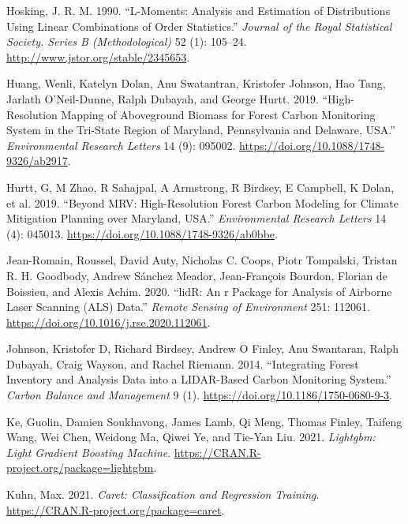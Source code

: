 \documentclass[review]{elsarticle} %
\newlength{\cslhangindent}
\newenvironment{CSLReferences}[2] %
 {%
  \setlength{\parindent}{0pt}
  \ifodd #1 \everypar{\setlength{\hangindent}{\cslhangindent}}\ignorespaces\fi
  \ifnum #2 > 0
  \setlength{\parskip}{#2\baselineskip}
  \fi
 }%
 {}
\begin{document}
\begin{CSLReferences}{1}{0}
\leavevmode{}%
Hosking, J. R. M. 1990. {``L-Moments: Analysis and Estimation of Distributions Using Linear Combinations of Order Statistics.''} \emph{Journal of the Royal Statistical Society. Series B (Methodological)} 52 (1): 105--24. \url{http://www.jstor.org/stable/2345653}.

\leavevmode{}%
Huang, Wenli, Katelyn Dolan, Anu Swatantran, Kristofer Johnson, Hao Tang, Jarlath O'Neil-Dunne, Ralph Dubayah, and George Hurtt. 2019. {``High-Resolution Mapping of Aboveground Biomass for Forest Carbon Monitoring System in the Tri-State Region of Maryland, Pennsylvania and Delaware, {USA}.''} \emph{Environmental Research Letters} 14 (9): 095002. \url{https://doi.org/10.1088/1748-9326/ab2917}.

\leavevmode{}%
Hurtt, G, M Zhao, R Sahajpal, A Armstrong, R Birdsey, E Campbell, K Dolan, et al. 2019. {``Beyond {MRV}: High-Resolution Forest Carbon Modeling for Climate Mitigation Planning over Maryland, {USA}.''} \emph{Environmental Research Letters} 14 (4): 045013. \url{https://doi.org/10.1088/1748-9326/ab0bbe}.

\leavevmode{}%
Jean-Romain, Roussel, David Auty, Nicholas C. Coops, Piotr Tompalski, Tristan R. H. Goodbody, Andrew Sánchez Meador, Jean-François Bourdon, Florian de Boissieu, and Alexis Achim. 2020. {``lidR: An r Package for Analysis of Airborne Laser Scanning (ALS) Data.''} \emph{Remote Sensing of Environment} 251: 112061. \url{https://doi.org/10.1016/j.rse.2020.112061}.

\leavevmode{}%
Johnson, Kristofer D, Richard Birdsey, Andrew O Finley, Anu Swantaran, Ralph Dubayah, Craig Wayson, and Rachel Riemann. 2014. {``Integrating Forest Inventory and Analysis Data into a {LIDAR}-Based Carbon Monitoring System.''} \emph{Carbon Balance and Management} 9 (1). \url{https://doi.org/10.1186/1750-0680-9-3}.

\leavevmode{}%
Ke, Guolin, Damien Soukhavong, James Lamb, Qi Meng, Thomas Finley, Taifeng Wang, Wei Chen, Weidong Ma, Qiwei Ye, and Tie-Yan Liu. 2021. \emph{Lightgbm: Light Gradient Boosting Machine}. \url{https://CRAN.R-project.org/package=lightgbm}.

\leavevmode{}%
Kuhn, Max. 2021. \emph{Caret: Classification and Regression Training}. \url{https://CRAN.R-project.org/package=caret}.


\end{CSLReferences}
\end{document}
